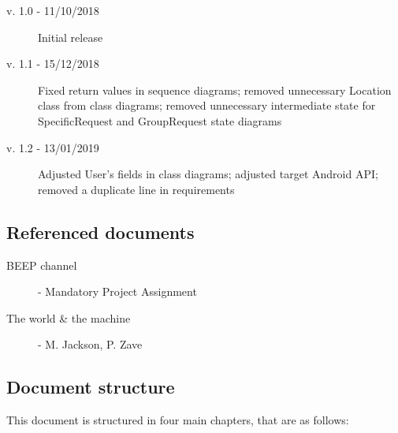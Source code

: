 \documentclass[../main.tex]{subfiles}
\begin{document}
\begin{description}
	\item [v. 1.0 - 11/10/2018] Initial release
	\item [v. 1.1 - 15/12/2018] Fixed return values in sequence diagrams; removed unnecessary Location class from class diagrams; removed unnecessary intermediate state for SpecificRequest and GroupRequest state diagrams
	\item [v. 1.2 - 13/01/2019] Adjusted User's fields in class diagrams; adjusted target Android API; removed a duplicate line in requirements
\end{description}

\subsection{Referenced documents}

\begin{minipage}{\textwidth}
\begin{description}
	\item [BEEP channel] - Mandatory Project Assignment
	\item [The world \& the machine] - M. Jackson, P. Zave
\end{description}
\end{minipage}

\subsection{Document structure}

This document is structured in four main chapters, that are as follows:
\end{document}
